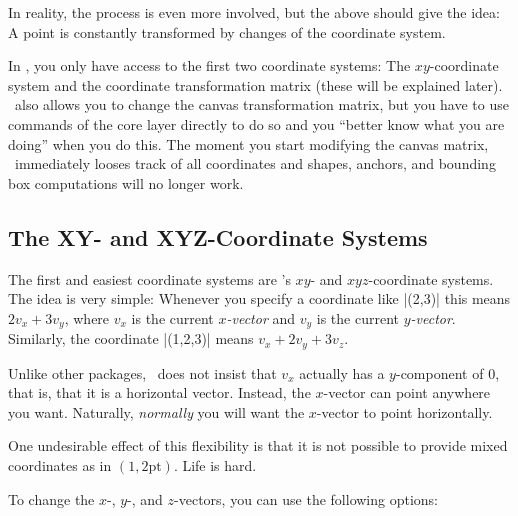 In reality, the process is even more involved, but the above should
give the idea: A point is constantly transformed by changes of the
coordinate system.

In \tikzname, you only have access to the first two coordinate systems:
The $xy$-coordinate system and the coordinate transformation matrix
(these will be explained later). \pgfname\ also allows you to change
the canvas transformation matrix, but you have to use commands of
the core layer directly to do so and you ``better know what you are
doing'' when you do this. The moment you start modifying the
canvas matrix, \pgfname\ immediately looses track of all
coordinates and shapes, anchors, and bounding box computations will no
longer work.


\subsection{The XY- and XYZ-Coordinate Systems}
\label{section-xyz}

The first and easiest coordinate systems are \pgfname's $xy$- and
$xyz$-coordinate systems. The idea is very simple: Whenever you
specify a coordinate like |(2,3)| this means $2v_x + 3v_y$, where
$v_x$ is the current \emph{$x$-vector} and $v_y$ is the current
\emph{$y$-vector}. Similarly, the coordinate |(1,2,3)| means $v_x +
2v_y + 3v_z$.

Unlike other packages, \pgfname\ does not insist that $v_x$ actually
has a $y$-component of $0$, that is, that it is a horizontal
vector. Instead, the $x$-vector can point anywhere you
want. Naturally, \emph{normally} you will want the $x$-vector to point
horizontally.

One undesirable effect of this flexibility is that it is not possible
to provide mixed coordinates as in $(1,2\mathrm{pt})$. Life is hard.

To change the $x$-, $y$-, and $z$-vectors, you can use the following
options:

